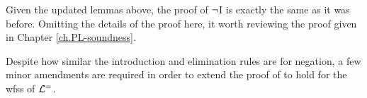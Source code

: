 Given the updated lemmas above, the proof of $\neg$I is exactly the same as it was before.
Omitting the details of the proof here, it worth reviewing the proof given in Chapter \ref{ch.PL-soundness}.



%
%

Despite how similar the introduction and elimination rules are for negation, a few minor amendments are required in order to extend the proof of  to hold for the wfss of $\mathcal{L}^{=}$.


